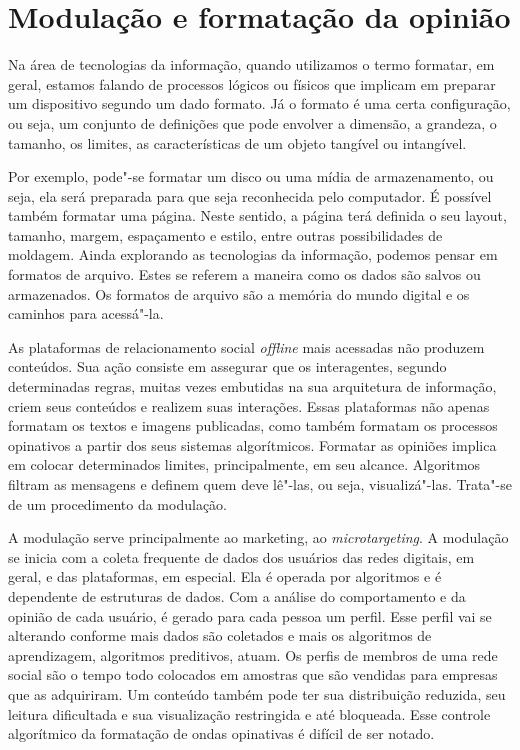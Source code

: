\section{Modulação e formatação da opinião}

\noindent{}Na área de tecnologias da informação, quando utilizamos o termo
formatar, em geral, estamos falando de processos lógicos ou físicos que
implicam em preparar um dispositivo segundo um dado formato. Já o
formato é uma certa configuração, ou seja, um conjunto de definições que
pode envolver a dimensão, a grandeza, o tamanho, os limites, as
características de um objeto tangível ou intangível.

Por exemplo, pode"-se formatar um disco ou uma mídia de armazenamento, ou
seja, ela será preparada para que seja reconhecida pelo computador. É
possível também formatar uma página. Neste sentido, a página terá
definida o seu layout, tamanho, margem, espaçamento e estilo, entre
outras possibilidades de moldagem. Ainda explorando as tecnologias da
informação, podemos pensar em formatos de arquivo. Estes se referem a
maneira como os dados são salvos ou armazenados. Os formatos de arquivo
são a memória do mundo digital e os caminhos para acessá"-la.

As plataformas de relacionamento social \emph{offline} mais acessadas não
produzem conteúdos. Sua ação consiste em assegurar que os interagentes,
segundo determinadas regras, muitas vezes embutidas na sua arquitetura
de informação, criem seus conteúdos e realizem suas interações. Essas
plataformas não apenas formatam os textos e imagens publicadas, como
também formatam os processos opinativos a partir dos seus sistemas
algorítmicos. Formatar as opiniões implica em colocar determinados
limites, principalmente, em seu alcance. Algoritmos filtram as mensagens
e definem quem deve lê"-las, ou seja, visualizá"-las. Trata"-se de um
procedimento da modulação.

A modulação serve principalmente ao marketing, ao \emph{microtargeting}.
A modulação se inicia com a coleta frequente de dados dos usuários das
redes digitais, em geral, e das plataformas, em especial. Ela é operada
por algoritmos e é dependente de estruturas de dados. Com a análise do
comportamento e da opinião de cada usuário, é gerado para cada pessoa um
perfil. Esse perfil vai se alterando conforme mais dados são coletados e
mais os algoritmos de aprendizagem, algoritmos preditivos, atuam. Os
perfis de membros de uma rede social são o tempo todo colocados em
amostras que são vendidas para empresas que as adquiriram. Um conteúdo
também pode ter sua distribuição reduzida, seu leitura dificultada e sua
visualização restringida e até bloqueada. Esse controle algorítmico da
formatação de ondas opinativas é difícil de ser notado.

